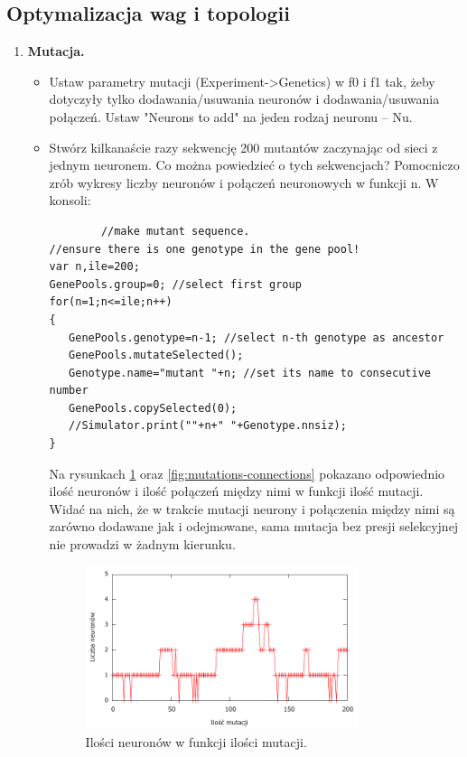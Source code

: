 \subsection{ Optymalizacja wag i topologii }

\begin{enumerate}
\item \textbf{Mutacja.}
	\begin{itemize}
		\item Ustaw parametry mutacji (Experiment->Genetics) w f0 i f1 tak, żeby dotyczyły tylko dodawania/usuwania neuronów i dodawania/usuwania połączeń. Ustaw "Neurons to add" na jeden rodzaj neuronu – Nu.
		\item Stwórz kilkanaście razy sekwencję 200 mutantów zaczynając od sieci z jednym neuronem. Co można powiedzieć o tych sekwencjach? Pomocniczo zrób wykresy liczby neuronów i połączeń neuronowych w funkcji n. 
W konsoli:
		\begin{verbatim}
		//make mutant sequence.
//ensure there is one genotype in the gene pool! 
var n,ile=200;
GenePools.group=0; //select first group
for(n=1;n<=ile;n++)
{
   GenePools.genotype=n-1; //select n-th genotype as ancestor
   GenePools.mutateSelected();
   Genotype.name="mutant "+n; //set its name to consecutive number
   GenePools.copySelected(0);
   //Simulator.print(""+n+" "+Genotype.nnsiz);
}
		\end{verbatim}

Na rysunkach \ref{fig:mutations-neurons} oraz \ref{fig:mutations-connections} pokazano odpowiednio ilość neuronów i ilość połączeń między nimi w funkcji ilość mutacji. Widać na nich, że w trakcie mutacji neurony i połączenia między nimi są zarówno dodawane jak i odejmowane, sama mutacja bez presji selekcyjnej nie prowadzi w żadnym kierunku.
		
	\begin{figure}[h]
	\centering
	\includegraphics[width=0.8\textwidth]{dane/part2/zad2/neurons}
	\caption{Ilości neuronów w funkcji ilości mutacji.\label{fig:mutations-neurons}}
	\end{figure}
	

\end{itemize}
\end{enumerate}
